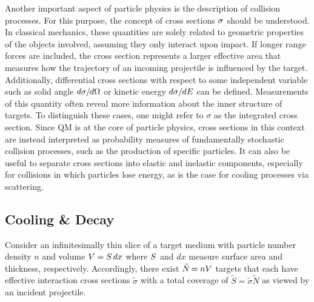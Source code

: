 Another important aspect of particle physics is the description of collision processes. For this purpose, the concept of cross
sections $\sigma \kern+0.5pt$ should be understood. In classical mechanics, these quantities are solely related to geometric
properties of the objects involved, assuming they only interact upon impact. If longer range forces are included, the
cross section represents a larger effective area that measures how the trajectory of an incoming projectile is influenced by
the target. Additionally, differential cross sections with respect to some independent variable such as solid angle
$d\sigma \kern-0.3pt / \kern-0.6pt d\Omega$ or kinetic energy $d\sigma \kern-0.3pt / \kern-0.6pt dE$ can be defined.
Measurements of this quantity often reveal more information about the inner structure of targets. To distinguish these cases,
one might refer to $\sigma$ as the integrated cross section. Since QM is at the core of particle physics, cross sections in this
context are instead interpreted as probability measures of fundamentally stochastic collision processes, such as the production
of specific particles. It can also be useful to separate cross sections into elastic and inelastic components, especially for
collisions in which particles lose energy, as is the case for cooling processes via scattering.



\subsection{Cooling \& Decay}
\label{sub:cooling}

Consider an infinitesimally thin slice of a target medium with particle number density $n$ and volume $V \kern-0.1pt = S \kern+1.5pt dx$
where $S \kern+0.5pt$ and $dx$ measure surface area and thickness, respectively. Accordingly, there exist $\tilde{N} \kern-1.2pt = nV$
targets that each have effective interaction cross sections $\tilde{\sigma}$ with a total coverage of $\tilde{S} = \tilde{\sigma} \tilde{N}$
as viewed by an incident projectile.

